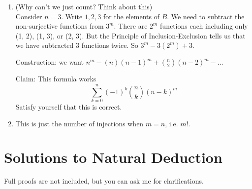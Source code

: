 \documentclass[10pt,a4paper]{article}
\begin{document}
\begin{enumerate}
\begin{enumerate}
        \item (Why can't we just count? Think about this) \\
        Consider \( n = 3 \). Write \(1, 2, 3\) for the elements of \(B\).
        We need to subtract the non-surjective functions from \( 3 ^ m \). 
        There are \( 2 ^ m \) functions each including only (1, 2), (1, 3), 
        or (2, 3). But the Principle of Inclusion-Exclusion tells us that 
        we have subtracted 3 functions twice. So \( 3^m - 3 (2^m) + 3 \).

        Construction: we want \( n^m - (n)(n-1)^m + {n \choose 2} (n-2)^m - \ldots \)

        Claim: This formula works\\
        \[ \sum_{k=0}^{n} (-1)^k {n \choose k} (n-k)^m \]
        Satisfy yourself that this is correct.

        \item This is just the number of injections when \( m = n \), i.e. \(m!\).
    \end{enumerate}
\end{enumerate}


\section{Solutions to Natural Deduction}

Full proofs are not included, but you can ask me for clarifications.
\end{document}
